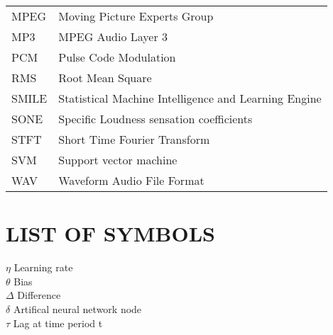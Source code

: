 \begin{longtable}[l]{p{50pt} p{200pt}}
        MPEG & Moving Picture Experts Group\\
        MP3 & MPEG Audio Layer 3\\
        PCM & Pulse Code Modulation\\
        RMS & Root Mean Square\\
        SMILE & Statistical Machine Intelligence and Learning Engine\\
        SONE & Specific Loudness sensation coefficients\\
        STFT & Short Time Fourier Transform\\
        SVM & Support vector machine\\
        WAV & Waveform Audio File Format\\

\end{longtable}

\newpage
\section*{\fontsize{14pt}{0pt}\bfseries LIST OF SYMBOLS}
\hspace{0mm}$\eta$\hspace{12mm} Learning rate\\
\hspace{4mm}$\theta$\hspace{12mm} Bias\\
\hspace{4mm}$\Delta$\hspace{12mm} Difference\\
\hspace{4mm}$\delta$\hspace{12mm} Artifical neural network node\\
\hspace{4mm}$\tau$\hspace{12mm} Lag at time period t
